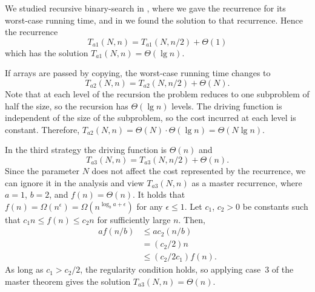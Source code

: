 We studied recursive binary-search in , where we gave the recurrence for its worst-case running time, and in  we found the solution to that recurrence.
Hence the recurrence
\[
    T_{a1}(N,n) = T_{a1}(N,n/2)+\Theta(1)
\]
which has the solution $T_{a1}(N,n)=\Theta(\lg n)$.

If arrays are passed by copying, the worst-case running time changes to
\[
    T_{a2}(N,n) = T_{a2}(N,n/2)+\Theta(N).
\]
Note that at each level of the recursion the problem reduces to one subproblem of half the size, so the recursion has $\Theta(\lg n)$ levels.
The driving function is independent of the size of the subproblem, so the cost incurred at each level is constant.
Therefore, $T_{a2}(N,n)=\Theta(N)\cdot\Theta(\lg n)=\Theta(N\lg n)$.

In the third strategy the driving function is $\Theta(n)$ and
\[
    T_{a3}(N,n) = T_{a3}(N,n/2)+\Theta(n).
\]
Since the parameter $N$ does not affect the cost represented by the recurrence, we can ignore it in the analysis and view $T_{a3}(N,n)$ as a master recurrence, where $a=1$, $b=2$, and $f(n)=\Theta(n)$.
It holds that $f(n)=\Omega(n^\epsilon)=\Omega(n^{\log_ba+\epsilon})$ for any $\epsilon\le1$.
Let $c_1$, $c_2>0$ be constants such that $c_1n\le f(n)\le c_2n$ for sufficiently large $n$.
Then,
\begin{align*}
    af(n/b) &\le ac_2(n/b) \\
    &= (c_2/2)n \\
    &\le (c_2/2c_1)f(n).
\end{align*}
As long as $c_1>c_2/2$, the regularity condition holds, so applying case~3 of the master theorem gives the solution $T_{a3}(N,n)=\Theta(n)$.

